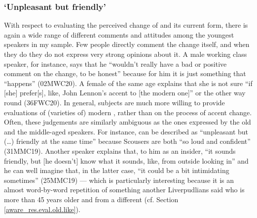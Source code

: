 \subsubsection{`Unpleasant but friendly'}
\label{aware_res.eval.young.like}

With respect to evaluating the perceived change of  and its current form, there is again a wide range of different comments and attitudes among the youngest speakers in my sample.
Few people directly comment the change itself, and when they do they do not express very strong opinions about it.
A male working class speaker, for instance, says that he ``wouldn't really have a bad or positive comment on the change, to be honest'' because for him it is just something that ``happens'' (02MWC20).
A female of the same age explains that she is not sure ``if [she] prefer[s], like, John Lennon's accent to [the modern one]'' or the other way round (36FWC20).
In general, subjects are much more willing to provide evaluations of (varieties of) modern , rather than on the process of accent change.
Often, these judgements are similarly ambiguous as the ones expressed by the old and the middle-aged speakers.
For instance,  can be described as ``unpleasant but (\ldots) friendly at the same time'' because Scousers are both ``so loud and confident'' (31MMC19).
Another speaker explains that, to him as an insider, ``it sounds friendly, but [he doesn't] know what it sounds, like, from outside looking in'' and he can well imagine that, in the latter case, ``it could be a bit intimidating sometimes'' (25MMC19) --- which is particularly interesting because it is an almost word-by-word repetition of something another Liverpudlians said who is more than 45 years older and from a different  (cf. Section \ref{aware_res.eval.old.like}).

